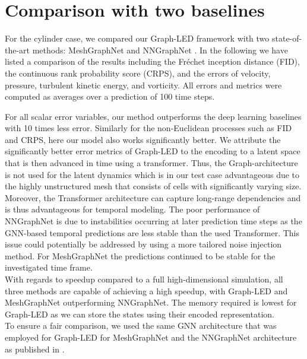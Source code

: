 \documentclass{article}
\begin{document}
\newpage
\section{Comparison with two baselines}
\label{sec:baselinecompare}


{ For the cylinder case, we compared our Graph-LED framework with two state-of-the-art methods: MeshGraphNet \cite{pfaff2020learning} and NNGraphNet \cite{gilmer2017neural, xu2021conditionally}. In the following we have listed a comparison of the results including the Fr\'echet inception distance (FID), the continuous rank probability score (CRPS), and the errors of velocity, pressure, turbulent kinetic energy, and vorticity. All errors and metrics were computed as averages over a prediction of 100 time steps.

For all scalar error variables, our method outperforms the deep learning baselines with 10 times less error. Similarly for the non-Euclidean processes such as FID and CRPS, here our model also works significantly better. We attribute the significantly better error metrics of Graph-LED to the encoding to a latent space that is then advanced in time using a transformer. Thus, the Graph-architecture is not used for the latent dynamics which is in our test case advantageous due to the highly unstructured mesh that consists of cells with significantly varying size. Moreover, the Transformer architecture can capture long-range dependencies and is thus advantageous for temporal modeling. The poor performance of NNGraphNet is due to instabilities occurring at later prediction time steps as the GNN-based temporal predictions are less stable than the  used Transformer. This issue could potentially be addressed by using a more tailored noise injection method. For MeshGraphNet the predictions continued to be stable for the investigated time frame.\\
With regards to speedup compared to a full high-dimensional simulation, all three methods are capable of achieving a high speedup, with Graph-LED and MeshGraphNet outperforming NNGraphNet. The memory required is lowest for Graph-LED as we can store the states using their encoded representation.\\

To ensure a fair comparison, we used the same GNN architecture that was employed for Graph-LED for MeshGraphNet and the NNGraphNet architecture as published in \cite{xu2021conditionally}.

}
\end{document}
